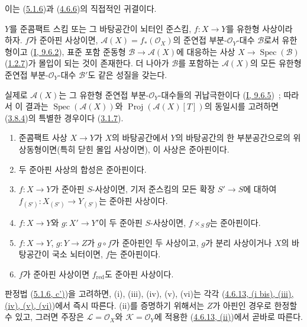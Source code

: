 이는 (\hyperref[II.5.1.6-ko]{5.1.6})과
(\hyperref[II.4.6.6-ko]{4.6.6})의 직접적인 귀결이다.

\begin{corollary}[5.1.9]
\label{II.5.1.9-ko}
$Y$를 준콤팩트 스킴 또는 그 바탕공간이 뇌터인 준스킴,
$f:X\to Y$를 유한형 사상이라 하자. $f$가 준아핀 사상이면,
$\mathcal{A}(X)=f_*(\mathcal{O}_X)$의 준연접
부분-$\mathcal{O}_Y$-대수 $\mathcal{B}$로서 유한형이고
(\hyperref[I.9.6.2-ko]{I, 9.6.2}), 표준 포함 준동형
$\mathcal{B}\to\mathcal{A}(X)$에 대응하는 사상
$X\to\operatorname{Spec}(\mathcal{B})$
(\hyperref[II.1.2.7-ko]{1.2.7})가 몰입이 되는 것이 존재한다.
더 나아가 $\mathcal{B}$를 포함하는 $\mathcal{A}(X)$의 모든 유한형
준연접 부분-$\mathcal{O}_Y$-대수 $\mathcal{B}'$도 같은 성질을 갖는다.
\end{corollary}

실제로 $\mathcal{A}(X)$는 그 유한형 준연접
부분-$\mathcal{O}_Y$-대수들의 귀납극한이다
(\hyperref[I.9.6.5-ko]{I, 9.6.5})~; 따라서 이 결과는
$\operatorname{Spec}(\mathcal{A}(X))$와
$\operatorname{Proj}(\mathcal{A}(X)[T])$의 동일시를 고려하면
(\hyperref[II.3.8.4-ko]{3.8.4})의 특별한 경우이다
(\hyperref[II.3.1.7-ko]{3.1.7}).

\begin{proposition}[5.1.10]
\label{II.5.1.10-ko}
\begin{enumerate}
  \item[\rm{(i)}] 준콤팩트 사상 $X\to Y$가 $X$의 바탕공간에서
  $Y$의 바탕공간의 한 부분공간으로의 위상동형이면(특히 닫힌 몰입
  사상이면), 이 사상은 준아핀이다.
  \item[\rm{(ii)}] 두 준아핀 사상의 합성은 준아핀이다.
  \item[\rm{(iii)}] $f:X\to Y$가 준아핀 $S$-사상이면, 기저 준스킴의
  모든 확장 $S'\to S$에 대하여
  $f_{(S')}:X_{(S')}\to Y_{(S')}$는 준아핀 사상이다.
  \item[\rm{(iv)}] $f:X\to Y$와 $g:X'\to Y'$이 두 준아핀
  $S$-사상이면, $f\times_S g$는 준아핀이다.
  \item[\rm{(v)}] $f:X\to Y$, $g:Y\to Z$가 $g\circ f$가 준아핀인 두
  사상이고, $g$가 분리 사상이거나 $X$의 바탕공간이 국소 뇌터이면,
  $f$는 준아핀이다.
  \item[\rm{(vi)}] $f$가 준아핀 사상이면 $f_{\mathrm{red}}$도
  준아핀 사상이다.
\end{enumerate}
\end{proposition}

판정법 (\hyperref[II.5.1.6-ko]{5.1.6, c')})을 고려하면, (i), (iii),
(iv), (v), (vi)는 각각
(\hyperref[II.4.6.13-ko]{4.6.13, (i bis), (iii), (iv), (v), (vi)})에서
즉시 따른다. (ii)를 증명하기 위해서는 $Z$가 아핀인 경우로 한정할 수
있고, 그러면 주장은 $\mathcal{L}=\mathcal{O}_X$와
$\mathcal{K}=\mathcal{O}_Y$에 적용한
(\hyperref[II.4.6.13-ko]{4.6.13, (ii)})에서 곧바로 따른다.

